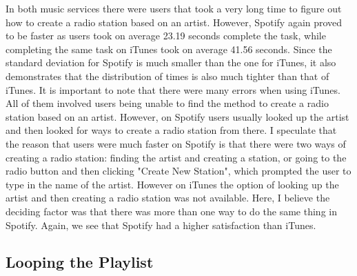 \documentclass[11pt]{article}
\begin{document}
In both music services there were users that took a very long time to figure out how to create a radio station based on an artist. However, Spotify again proved to be faster as users took on average 23.19 seconds complete the task, while completing the same task on iTunes took on average 41.56 seconds. Since the standard deviation for Spotify is much smaller than the one for iTunes, it also demonstrates that the distribution of times is also much tighter than that of iTunes. It is important to note that there were many errors when using iTunes. All of them involved users being unable to find the method to create a radio station based on an artist. However, on Spotify users usually looked up the artist and then looked for ways to create a radio station from there. I speculate that the reason that users were much faster on Spotify is that there were two ways of creating a radio station: finding the artist and creating a station, or going to the radio button and then clicking "Create New Station", which prompted the user to type in the name of the artist. However on iTunes the option of looking up the artist and then creating a radio station was not available. Here, I believe the deciding factor was that there was more than one way to do the same thing in Spotify. Again, we see that Spotify had a higher satisfaction than iTunes.

\subsection{Looping the Playlist}
\end{document}
